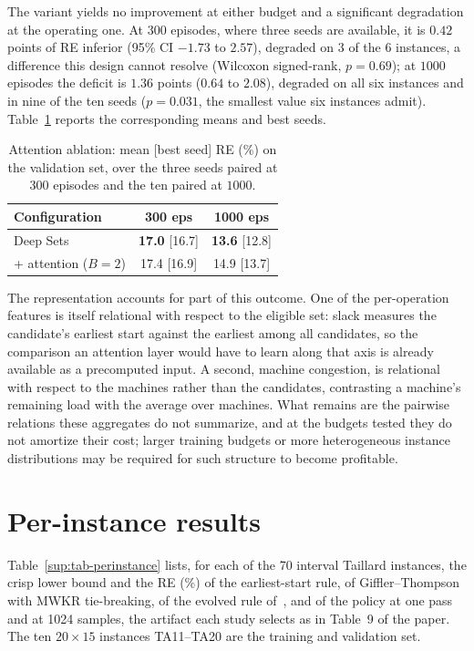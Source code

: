 \documentclass[preprint,12pt]{elsarticle}
\begin{document}
The variant yields no improvement at either budget and a significant
degradation at the operating one. At $300$ episodes, where three
seeds are available, it is $0.42$ points of RE inferior (95\% CI
$-1.73$ to $2.57$), degraded on 3 of the 6 instances, a difference
this design cannot resolve (Wilcoxon signed-rank, $p=0.69$); at
$1000$ episodes the deficit is $1.36$ points ($0.64$ to $2.08$),
degraded on all six instances and in nine of the ten seeds
($p=0.031$, the smallest value six instances admit).
Table~\ref{sup:tab-attn} reports the corresponding means and best
seeds.

\begin{table}[!htb]
\centering\small
\caption{Attention ablation: mean [best seed] RE (\%) on the
validation set, over the three seeds paired at $300$ episodes and the
ten paired at $1000$.}
\label{sup:tab-attn}
\begin{tabular}{lcc}
\toprule
Configuration & 300 eps & 1000 eps \\
\midrule
Deep Sets & \textbf{17.0} [16.7] & \textbf{13.6} [12.8] \\
+ attention ($B{=}2$) & 17.4 [16.9] & 14.9 [13.7] \\
\bottomrule
\end{tabular}
\end{table}

The representation accounts for part of this outcome. One of the
per-operation features is itself relational with respect to the
eligible set: slack measures the candidate's earliest start against
the earliest among all candidates, so the comparison an attention
layer would have to learn along that axis is already available as a
precomputed input. A second, machine congestion, is relational with
respect to the machines rather than the candidates, contrasting a
machine's remaining load with the average over machines. What remains
are the pairwise relations these aggregates do not summarize, and at
the budgets tested they do not amortize their cost; larger training
budgets or more heterogeneous instance distributions may be required
for such structure to become profitable.

\section{Per-instance results}
\label{sup:perinstance}

Table~\ref{sup:tab-perinstance} lists, for each of the 70 interval
Taillard instances, the crisp lower bound and the RE (\%) of the
earliest-start rule, of Giffler--Thompson with MWKR tie-breaking, of
the evolved rule of~\citet{DiazGP2026}, and of the policy at one pass
and at 1024 samples, the artifact each study selects as in Table~9 of
the paper. The ten $20{\times}15$ instances TA11--TA20 are the
training and validation set.
\end{document}
